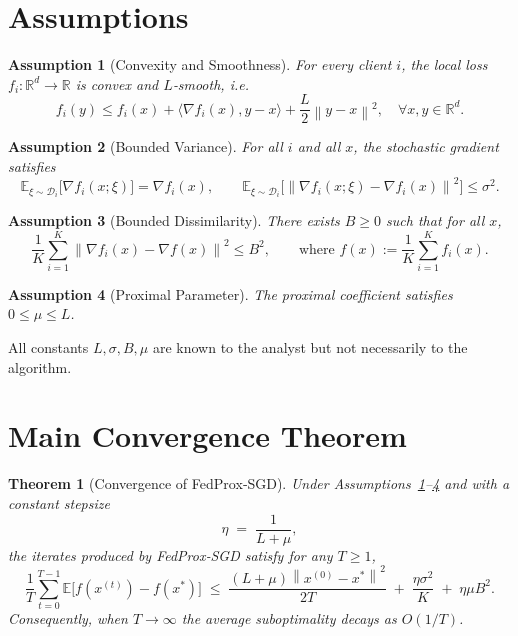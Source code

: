 \documentclass{article}
\newtheorem{theorem}{Theorem}
\newtheorem{assumption}{Assumption}
\newcommand{\E}{\mathbb{E}}
\newcommand{\norm}[1]{\left\lVert#1\right\rVert}
\begin{document}
\vspace{0.3cm}
\section*{Assumptions}
\begin{assumption}[Convexity and Smoothness]\label{as:convex-smooth}
For every client $i$, the local loss $f_i:\mathbb{R}^{d}\to\mathbb{R}$ is convex and $L$‑smooth, i.e.
\[
f_i(y)\le f_i(x)+\langle\nabla f_i(x),y-x\rangle+\frac{L}{2}\norm{y-x}^{2},
\quad\forall x,y\in\mathbb{R}^{d}.
\]
\end{assumption}
\begin{assumption}[Bounded Variance]\label{as:variance}
For all $i$ and all $x$, the stochastic gradient satisfies
\[
\E_{\xi\sim\mathcal{D}_i}\!\bigl[\nabla f_i(x;\xi)\bigr]=\nabla f_i(x),\qquad
\E_{\xi\sim\mathcal{D}_i}\!\bigl[\norm{\nabla f_i(x;\xi)-\nabla f_i(x)}^{2}\bigr]\le\sigma^{2}.
\]
\end{assumption}
\begin{assumption}[Bounded Dissimilarity]\label{as:dissimilarity}
There exists $B\ge0$ such that for all $x$,
\[
\frac{1}{K}\sum_{i=1}^{K}\norm{\nabla f_i(x)-\nabla f(x)}^{2}\le B^{2},
\qquad\text{where }f(x):=\frac{1}{K}\sum_{i=1}^{K}f_i(x).
\]
\end{assumption}
\begin{assumption}[Proximal Parameter]\label{as:mu}
The proximal coefficient satisfies $0\le\mu\le L$.
\end{assumption}
All constants $L,\sigma,B,\mu$ are known to the analyst but not necessarily to the algorithm.

\vspace{0.2cm}
\section*{Main Convergence Theorem}
\begin{theorem}[Convergence of FedProx‑SGD]\label{thm:conv}
Under Assumptions~\ref{as:convex-smooth}–\ref{as:mu} and with a constant stepsize
\[
\eta\;=\;\frac{1}{L+\mu},
\]
the iterates produced by FedProx‑SGD satisfy for any $T\ge1$,
\[
\boxed{
\frac{1}{T}\sum_{t=0}^{T-1}\E\bigl[f(x^{(t)})-f(x^{*})\bigr]
\;\le\;
\frac{(L+\mu)\norm{x^{(0)}-x^{*}}^{2}}{2T}
\;+\;
\frac{\eta\sigma^{2}}{K}
\;+\;
\eta\mu B^{2}.
}
\]
Consequently, when $T\to\infty$ the average suboptimality decays as $O(1/T)$.
\end{theorem}

\vspace{0.2cm}
\end{document}
